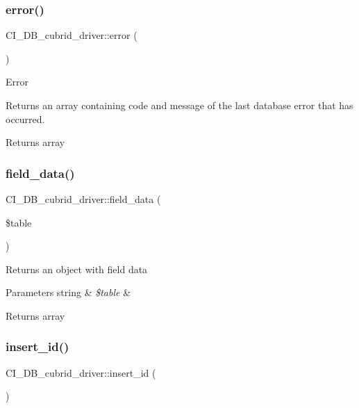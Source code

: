 \subsubsection{\texorpdfstring{error()}{error()}}
{\footnotesize\ttfamily C\+I\+\_\+\+D\+B\+\_\+cubrid\+\_\+driver\+::error (\begin{DoxyParamCaption}{ }\end{DoxyParamCaption})}

Error

Returns an array containing code and message of the last database error that has occurred.

\begin{DoxyReturn}{Returns}
array 
\end{DoxyReturn}
\mbox{\label{class_c_i___d_b__cubrid__driver_a8006c7fbb75eceb9d5ec9246afb90f7f}} 
\subsubsection{\texorpdfstring{field\+\_\+data()}{field\_data()}}
{\footnotesize\ttfamily C\+I\+\_\+\+D\+B\+\_\+cubrid\+\_\+driver\+::field\+\_\+data (\begin{DoxyParamCaption}\item[{}]{\$table }\end{DoxyParamCaption})}

Returns an object with field data


\begin{DoxyParams}[1]{Parameters}
string & {\em \$table} & \\
\hline
\end{DoxyParams}
\begin{DoxyReturn}{Returns}
array 
\end{DoxyReturn}
\mbox{\label{class_c_i___d_b__cubrid__driver_adea3af9abf1db1b4d802da2160f8fc73}} 
\subsubsection{\texorpdfstring{insert\+\_\+id()}{insert\_id()}}
{\footnotesize\ttfamily C\+I\+\_\+\+D\+B\+\_\+cubrid\+\_\+driver\+::insert\+\_\+id (\begin{DoxyParamCaption}{ }\end{DoxyParamCaption})}

